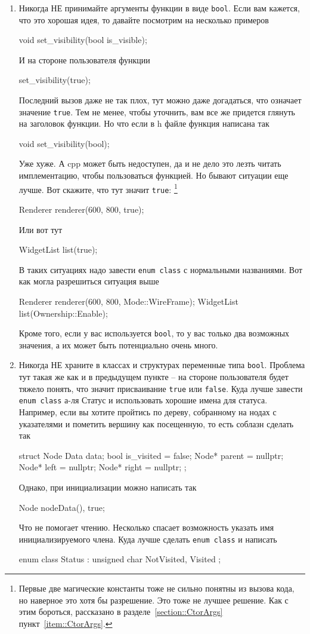 \begin{enumerate}
\item Никогда НЕ принимайте аргументы функции в виде \verb"bool".
Если вам кажется, что это хорошая идея, то давайте посмотрим на несколько примеров
\begin{cppcode}
void set_visibility(bool is_visible);
\end{cppcode}
И на стороне пользователя функции
\begin{cppcode}
set_visibility(true);
\end{cppcode}
Последний вызов даже не так плох, тут можно даже догадаться, что означает значение \verb"true".
Тем не менее, чтобы уточнить, вам все же придется глянуть на заголовок функции.
Но что если в h файле функция написана так
\begin{cppcode}
void set_visibility(bool);
\end{cppcode}
Уже хуже.
А cpp может быть недоступен, да и не дело это лезть читать имплементацию, чтобы пользоваться функцией.
Но бывают ситуации еще лучше.
Вот скажите, что тут значит \verb"true":%
\footnote{Первые две магические константы тоже не сильно понятны из вызова кода, но наверное это хотя бы разрешение.
Это тоже не лучшее решение.
Как с этим бороться, рассказано в разделе~\ref{section::CtorArgs} пункт~\ref{item::CtorArgs}.}
\begin{cppcode}
Renderer renderer(600, 800, true);
\end{cppcode}
Или вот тут
\begin{cppcode}
WidgetList list(true);
\end{cppcode}
В таких ситуациях надо завести \verb"enum class" с нормальными названиями.
Вот как могла разрешиться ситуация выше
\begin{cppcode}
Renderer renderer(600, 800, Mode::WireFrame);
WidgetList list(Ownership::Enable);
\end{cppcode}
Кроме того, если у вас используется \verb"bool", то у вас только два возможных значения, а их может быть потенциально очень много.

\item Никогда НЕ храните в классах и структурах переменные типа \verb"bool".
Проблема тут такая же как и в предыдущем пункте -- на стороне пользователя будет тяжело понять, что значит присваивание \verb"true" или \verb"false".
Куда лучше завести \verb"enum class" а-ля Статус и использовать хорошие имена для статуса.
Например, если вы хотите пройтись по дереву, собранному на нодах с указателями и пометить вершину как посещенную, то есть соблазн сделать так
\begin{cppcode}
struct Node {
  Data data;
  bool is_visited = false;
  Node* parent = nullptr;
  Node* left = nullptr;
  Node* right = nullptr;
};
\end{cppcode}
Однако, при инициализации можно написать так
\begin{cppcode}
Node node{Data(), true};
\end{cppcode}
Что не помогает чтению.
Несколько спасает возможность указать имя инициализируемого члена.
Куда лучше сделать \verb"enum class" и написать
\begin{cppcode}
enum class Status : unsigned char {
  NotVisited, Visited
};


\end{cppcode}
\end{enumerate}
